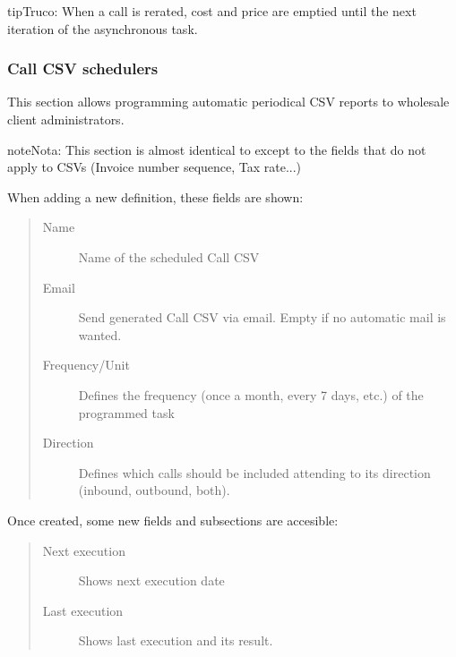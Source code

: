 \documentclass[letterpaper,10pt,spanish]{sphinxmanual}
\begin{document}
\begin{notice}{tip}{Truco:}
When a call is rerated, cost and price are emptied until the next iteration of the asynchronous task.
\end{notice}


\subsubsection{Call CSV schedulers}
\label{administration_portal/client/wholesale/calls/call_csv_schedulers:call-csv-schedulers}\label{administration_portal/client/wholesale/calls/call_csv_schedulers::doc}
This section allows programming automatic periodical CSV reports to wholesale client administrators.

\begin{notice}{note}{Nota:}
This section is almost identical to {\hyperref[administration_portal/brand/invoicing/invoice_schedulers:invoice\string-schedulers]{}} except to the
fields that do not apply to CSVs (Invoice number sequence, Tax rate...)
\end{notice}

When adding a new definition, these fields are shown:
\begin{quote}
\begin{description}
\item[{Name}] \leavevmode
Name of the scheduled Call CSV

\item[{Email}] \leavevmode
Send generated Call CSV via email. Empty if no automatic mail is wanted.

\item[{Frequency/Unit}] \leavevmode
Defines the frequency (once a month, every 7 days, etc.) of the programmed task

\item[{Direction}] \leavevmode
Defines which calls should be included attending to its direction (inbound, outbound, both).

\end{description}
\end{quote}

Once created, some new fields and subsections are accesible:
\begin{quote}
\begin{description}
\item[{Next execution}] \leavevmode
Shows next execution date

\item[{Last execution}] \leavevmode
Shows last execution and its result.

\end{description}
\end{quote}
\end{document}
